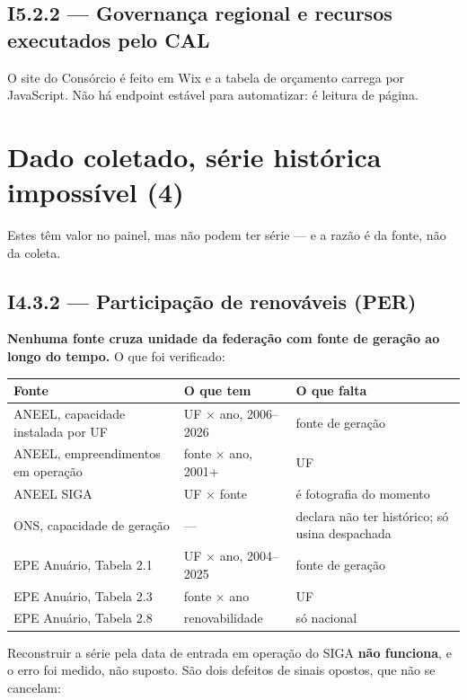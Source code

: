 \documentclass[11pt,a4paper]{article}
\begin{document}
\subsection*{I5.2.2 --- Governança regional e recursos executados pelo CAL}

O site do Consórcio é feito em Wix e a tabela de orçamento carrega por JavaScript. Não
há endpoint estável para automatizar: é leitura de página.

\section{Dado coletado, série histórica impossível (4)}

Estes têm valor no painel, mas não podem ter série --- e a razão é da fonte, não da
coleta.

\subsection*{I4.3.2 --- Participação de renováveis (PER)}

\textbf{Nenhuma fonte cruza unidade da federação com fonte de geração ao longo do
tempo.} O que foi verificado:

\begin{center}
\begin{tabular}{L{6.0cm} L{4.2cm} L{4.4cm}}
\toprule
\textbf{Fonte} & \textbf{O que tem} & \textbf{O que falta} \\
\midrule
ANEEL, capacidade instalada por UF & UF $\times$ ano, 2006--2026 & fonte de geração \\
ANEEL, empreendimentos em operação & fonte $\times$ ano, 2001+ & UF \\
ANEEL SIGA & UF $\times$ fonte & é fotografia do momento \\
ONS, capacidade de geração & --- & declara não ter histórico; só usina despachada \\
EPE Anuário, Tabela 2.1 & UF $\times$ ano, 2004--2025 & fonte de geração \\
EPE Anuário, Tabela 2.3 & fonte $\times$ ano & UF \\
EPE Anuário, Tabela 2.8 & renovabilidade & só nacional \\
\bottomrule
\end{tabular}
\end{center}

Reconstruir a série pela data de entrada em operação do SIGA \textbf{não funciona}, e o
erro foi medido, não suposto. São dois defeitos de sinais opostos, que não se cancelam:
\end{document}

